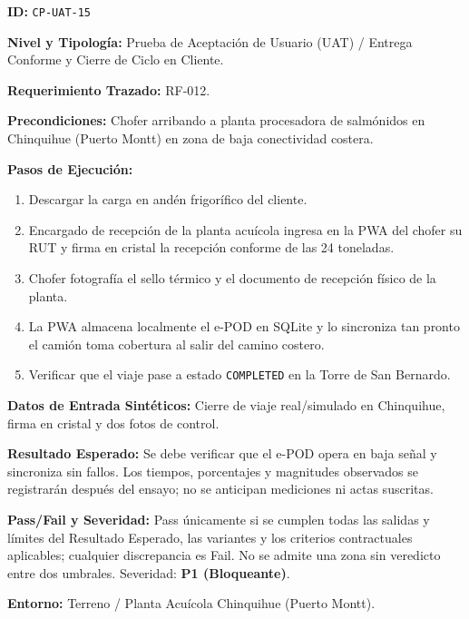 \par\noindent\textbf{ID:} \texttt{C\allowbreak{}P\allowbreak{}-\allowbreak{}U\allowbreak{}A\allowbreak{}T\allowbreak{}-\allowbreak{}1\allowbreak{}5\allowbreak{}}\par
\par\noindent\textbf{Nivel y Tipología:} Prueba de Aceptación de Usuario (UAT) / Entrega Conforme y Cierre de Ciclo en Cliente.\par
\par\noindent\textbf{Requerimiento Trazado:} RF-012.\par
\par\noindent\textbf{Precondiciones:} Chofer arribando a planta procesadora de salmónidos en Chinquihue (Puerto Montt) en zona de baja conectividad costera.\par
\par\noindent\textbf{Pasos de Ejecución:} \par
\begin{enumerate}
\item Descargar la carga en andén frigorífico del cliente.
\item Encargado de recepción de la planta acuícola ingresa en la PWA del chofer su RUT y firma en cristal la recepción conforme de las 24 toneladas.
\item Chofer fotografía el sello térmico y el documento de recepción físico de la planta.
\item La PWA almacena localmente el e-POD en SQLite y lo sincroniza tan pronto el camión toma cobertura al salir del camino costero.
\item Verificar que el viaje pase a estado \texttt{C\allowbreak{}O\allowbreak{}M\allowbreak{}P\allowbreak{}L\allowbreak{}E\allowbreak{}T\allowbreak{}E\allowbreak{}D\allowbreak{}} en la Torre de San Bernardo.
\end{enumerate}
\par\noindent\textbf{Datos de Entrada Sintéticos:} Cierre de viaje real/simulado en Chinquihue, firma en cristal y dos fotos de control.\par
\par\noindent\textbf{Resultado Esperado:} Se debe verificar que el e-POD opera en baja señal y sincroniza sin fallos. Los tiempos, porcentajes y magnitudes observados se registrarán después del ensayo; no se anticipan mediciones ni actas suscritas.\par
\par\noindent\textbf{Pass/Fail y Severidad:} Pass únicamente si se cumplen todas las salidas y límites del Resultado Esperado, las variantes y los criterios contractuales aplicables; cualquier discrepancia es Fail. No se admite una zona sin veredicto entre dos umbrales. Severidad: \textbf{P1 (Bloqueante)}.\par
\par\noindent\textbf{Entorno:} Terreno / Planta Acuícola Chinquihue (Puerto Montt).\par





\endgroup
